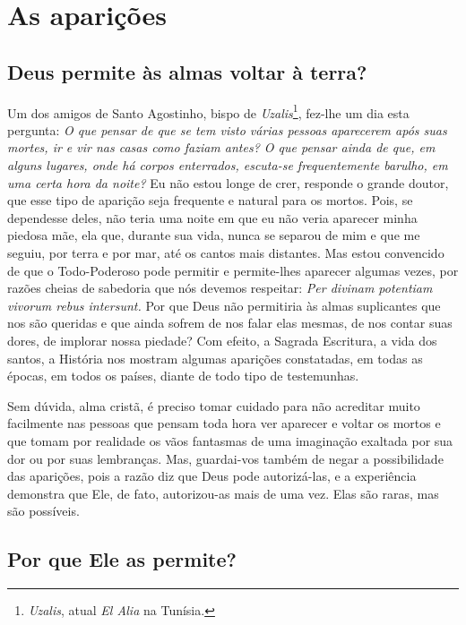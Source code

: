 \renewcommand{\thechapterdisplay}{Vigésimo nono dia}
\renewcommand{\thechapterrunner}{As aparições}
\chapter[Vigésimo nono dia --- As aparições]{As aparições}
\section*{Deus permite às almas voltar à terra?}

Um dos amigos de Santo Agostinho, bispo de \textit{Uzalis}\footnote{\textit{Uzalis}, atual \textit{El Alia} na Tunísia.}, fez-lhe um dia esta pergunta: \textit{O que pensar de que se tem visto várias pessoas aparecerem após suas mortes, ir e vir nas casas como faziam antes? O que pensar ainda de que, em alguns lugares, onde há corpos enterrados, escuta-se frequentemente barulho, em uma certa hora da noite?} Eu não estou longe de crer, responde o grande doutor, que esse tipo de aparição seja frequente e natural para os mortos. Pois, se dependesse deles, não teria uma noite em que eu não veria aparecer minha piedosa mãe, ela que, durante sua vida, nunca se separou de mim e que me seguiu, por terra e por mar, até os cantos mais distantes. Mas estou convencido de que o Todo-Poderoso pode permitir e permite-lhes aparecer algumas vezes, por razões cheias de sabedoria que nós devemos respeitar: \textit{Per divinam potentiam vivorum rebus intersunt.} Por que Deus não permitiria às almas suplicantes que nos são queridas e que ainda sofrem de nos falar elas mesmas, de nos contar suas dores, de implorar nossa piedade? Com efeito, a Sagrada Escritura, a vida dos santos, a História nos mostram algumas aparições constatadas, em todas as épocas, em todos os países, diante de todo tipo de testemunhas.

Sem dúvida, alma cristã, é preciso tomar cuidado para não acreditar muito facilmente nas pessoas que pensam toda hora ver aparecer e voltar os mortos e que tomam por realidade os vãos fantasmas de uma imaginação exaltada por sua dor ou por suas lembranças. Mas, guardai-vos também de negar a possibilidade das aparições, pois a razão diz que Deus pode autorizá-las, e a experiência demonstra que Ele, de fato, autorizou-as mais de uma vez. Elas são raras, mas são possíveis.


\section*{Por que Ele as permite?}

